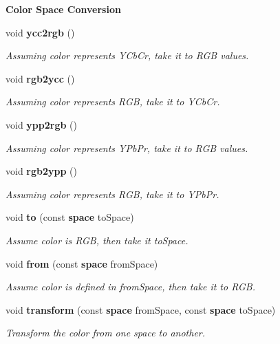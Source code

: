 \begin{Indent}{\bf Color Space Conversion}
\begin{CompactItemize}
void {\bf ycc2rgb} ()
\begin{CompactList}\small\item\em Assuming color represents YCb\-Cr, take it to RGB values. \item\end{CompactList}\item 
void {\bf rgb2ycc} ()
\begin{CompactList}\small\item\em Assuming color represents RGB, take it to YCb\-Cr. \item\end{CompactList}\item 
void {\bf ypp2rgb} ()
\begin{CompactList}\small\item\em Assuming color represents YPb\-Pr, take it to RGB values. \item\end{CompactList}\item 
void {\bf rgb2ypp} ()
\begin{CompactList}\small\item\em Assuming color represents RGB, take it to YPb\-Pr. \item\end{CompactList}\item 
void {\bf to} (const {\bf space} to\-Space)
\begin{CompactList}\small\item\em Assume color is RGB, then take it to\-Space. \item\end{CompactList}\item 
void {\bf from} (const {\bf space} from\-Space)
\begin{CompactList}\small\item\em Assume color is defined in from\-Space, then take it to RGB. \item\end{CompactList}\item 
void {\bf transform} (const {\bf space} from\-Space, const {\bf space} to\-Space)
\begin{CompactList}\small\item\em Transform the color from one space to another. \item\end{CompactList}\end{CompactItemize}
\end{Indent}
